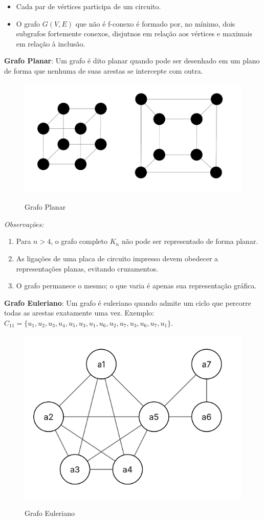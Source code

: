 \begin{itemize}
    \item Cada par de vértices participa de um circuito.
    \item O grafo $G(V, E)$ que não é f-conexo é formado por, no mínimo, dois subgrafos fortemente conexos, disjutnos em relação aos vértices e maximais em relação à inclusão.
\end{itemize}

\textbf{Grafo Planar}:
Um grafo é dito planar quando pode ser desenhado em um plano de forma que nenhuma de suas arestas se intercepte com outra.

\begin{figure} [H]
	\centering
	\caption{Grafo Planar}%
	\label{fig:planar}%
	\includegraphics[width=0.4\linewidth,angle=0]{figuras/grafo_planar.png}%
	\\
\end{figure}

\textit{Observações:}
\begin{enumerate}
    \item Para $n > 4$, o grafo completo $K_n$ não pode ser representado de forma planar.
    \item As ligações de uma placa de circuito impresso devem obedecer a representações planas, evitando cruzamentos.
    \item O grafo permanece o mesmo; o que varia é apenas sua representação gráfica.
\end{enumerate}

\textbf{Grafo Euleriano}:
Um grafo é euleriano quando admite um ciclo que percorre todas as arestas exatamente uma vez.
Exemplo: $C_{11} = \{u_1, u_2, u_3, u_4, u_5, u_3, u_1, u_6, u_2, u_7, u_3, u_6, u_7, u_1\}$.

\begin{figure} [H]
	\centering
	\caption{Grafo Euleriano}%
	\label{fig:euler}%
	\includegraphics[width=0.4\linewidth,angle=0]{figuras/grafo_euleriano.png}%
	\\
\end{figure}

